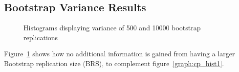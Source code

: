 \subsection{Bootstrap Variance Results}

\begin{figure}
\begin{minipage}{7cm}
\centerline{}
\end{minipage}
\hfill
\begin{minipage}{7cm}
\centerline{}
\end{minipage}
\caption{\label{graph:histo2} {Histograms displaying variance of 500 and 10000 bootstrap replications}}
\end{figure}

Figure~\ref{graph:histo2} shows how no additional information is gained
from having a larger Bootstrap replication size (BRS), to complement
figure~\ref{graph:cp_hist1}.


